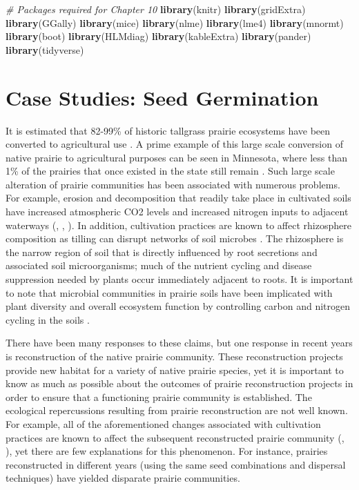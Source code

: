 \documentclass[
]{krantz}
\newenvironment{Shaded}{\begin{snugshade}}{\end{snugshade}}
\newcommand{\CommentTok}[1]{\textcolor[rgb]{0.37,0.37,0.37}{\textit{#1}}}
\newcommand{\KeywordTok}[1]{\textcolor[rgb]{0.27,0.27,0.27}{\textbf{#1}}}
\newcommand{\NormalTok}[1]{#1}
\begin{document}
\begin{Shaded}
\begin{Highlighting}[]
\CommentTok{# Packages required for Chapter 10}
\KeywordTok{library}\NormalTok{(knitr)}
\KeywordTok{library}\NormalTok{(gridExtra)}
\KeywordTok{library}\NormalTok{(GGally)}
\KeywordTok{library}\NormalTok{(mice)}
\KeywordTok{library}\NormalTok{(nlme)}
\KeywordTok{library}\NormalTok{(lme4)}
\KeywordTok{library}\NormalTok{(mnormt)}
\KeywordTok{library}\NormalTok{(boot)}
\KeywordTok{library}\NormalTok{(HLMdiag)}
\KeywordTok{library}\NormalTok{(kableExtra)}
\KeywordTok{library}\NormalTok{(pander)}
\KeywordTok{library}\NormalTok{(tidyverse)}
\end{Highlighting}
\end{Shaded}

\hypertarget{cs:seeds}{%
\section{Case Studies: Seed Germination}\label{cs:seeds}}

It is estimated that 82-99\% of historic tallgrass prairie ecosystems have been converted to agricultural use \citep{Baer2002}. A prime example of this large scale conversion of native prairie to agricultural purposes can be seen in Minnesota, where less than 1\% of the prairies that once existed in the state still remain \citep{Camill2004}. Such large scale alteration of prairie communities has been associated with numerous problems. For example, erosion and decomposition that readily take place in cultivated soils have increased atmospheric CO2 levels and increased nitrogen inputs to adjacent waterways (\citet{Baer2002}, \citet{Camill2004}, \citet{Knops2000}). In addition, cultivation practices are known to affect rhizosphere composition as tilling can disrupt networks of soil microbes \citep{Allison2005}. The rhizosphere is the narrow region of soil that is directly influenced by root secretions and associated soil microorganisms; much of the nutrient cycling and disease suppression needed by plants occur immediately adjacent to roots. It is important to note that microbial communities in prairie soils have been implicated with plant diversity and overall ecosystem function by controlling carbon and nitrogen cycling in the soils \citep{Zak2003}.

There have been many responses to these claims, but one response in recent years is reconstruction of the native prairie community. These reconstruction projects provide new habitat for a variety of native prairie species, yet it is important to know as much as possible about the outcomes of prairie reconstruction projects in order to ensure that a functioning prairie community is established. The ecological repercussions resulting from prairie reconstruction are not well known. For example, all of the aforementioned changes associated with cultivation practices are known to affect the subsequent reconstructed prairie community (\citet{Baer2002}, \citet{Camill2004}), yet there are few explanations for this phenomenon. For instance, prairies reconstructed in different years (using the same seed combinations and dispersal techniques) have yielded disparate prairie communities.
\end{document}
